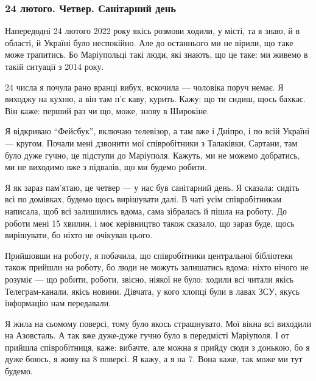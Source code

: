  
 
 
 
 

\subsubsection{24 лютого. Четвер. Санітарний день}

Напередодні 24 лютого 2022 року якісь розмови ходили, у місті, та я знаю, й в
області, й Україні було неспокійно. Але до останнього ми не вірили, що таке
може трапитись. Бо Маріупольці такі люди, які знають, що це таке: ми живемо в
такій ситуації з 2014 року.

24 числа я почула рано вранці вибух, вскочила — чоловіка поруч немає. Я виходжу
на кухню, а він там п'є каву, курить. Кажу: що ти сидиш, щось бахкає. Він каже:
перший раз чи що, може, знову в Широкіне.

Я відкриваю \enquote{Фейсбук}, включаю телевізор, а там вже і Дніпро, і по всій Україні
— кругом. Почали мені дзвонити мої співробітники з Талаківки, Сартани, там було
дуже гучно, це підступи до Маріуполя. Кажуть, ми не можемо добратись, ми не
виходимо вже з підвалів, що ми будемо робити.


Я як зараз пам'ятаю, це четвер — у нас був санітарний день. Я сказала: сидіть
всі по домівках, будемо щось вирішувати далі. В чаті усім співробітникам
написала, щоб всі залишились вдома, сама зібралась й пішла на роботу. До роботи
мені 15 хвилин, і моє керівництво також сказало, що зараз буде, щось
вирішувати, бо ніхто не очікував цього.

Прийшовши на роботу, я побачила, що співробітники центральної бібліотеки також
прийшли на роботу, бо люди не можуть залишатись вдома: ніхто нічого не розуміє
— що робити, роботи, звісно, ніякої не було: ходили всі читали якісь
Телеграм-канали, якісь новини. Дівчата, у кого хлопці були в лавах ЗСУ, якусь
інформацію нам передавали.

Я жила на сьомому поверсі, тому було якось страшнувато. Мої вікна всі виходили
на Азовсталь. А так вже дуже-дуже гучно було в передмісті Маріуполя. І от
прийшла співробітниця, каже: вибачте, але можна я прийду сюди з донькою, бо я
дуже боюсь, я живу на 8 поверсі. Я кажу, а я на 7. Вона каже, так може ми тут
будемо.

